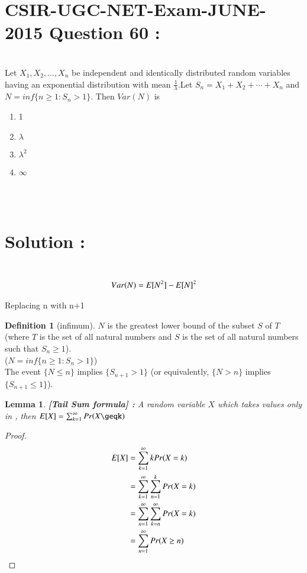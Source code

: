 \documentclass[journal,12pt,twocolumn]{IEEEtran}
\newtheorem{lemma}[theorem]{Lemma}
\theoremstyle{definition}
\newtheorem{definition}{Definition}[section]
\begin{document}
\section{CSIR-UGC-NET-Exam-JUNE-2015 Question 60 :}\\
Let $X_1, X_2, \dots, X_n$ be independent and identically distributed random variables having an exponential distribution with mean $\frac{1}{\lambda}$.Let $S_n = X_1 + X_2 + \cdots + X_n$ and $N = inf \{n \geq 1: S_n > 1\}$. Then $Var(N)$ is\\
\begin{enumerate}
    \item 1
    \item $\lambda$
    \item $\lambda^2$
    \item $\infty$
\end{enumerate}
\\ \\
\section{Solution :}\\
\begin{align}
    Var(N) = E[ N^2 ] - E[ N ]^2
\end{align}

Replacing n with n+1\\
\begin{definition}[infimum]
$N$ is the greatest lower bound of the subset $S$ of $T$ (where $T$ is the set of all natural numbers and $S$ is the set of all natural numbers such that $S_n \geq 1$).\\
($N = inf \{n \geq 1: S_n > 1\}$)\\
The event $\{N \leq n\}$ implies $\{S_{n+1} > 1\}$ (or equivalently, $\{N > n\}$ implies $\{S_{n+1} \leq 1\}$).\\
\end{definition}

\begin{lemma}\label{lemma1}
\textbf{[Tail Sum formula] : } A random variable $X$ which takes values only in , then $\mean{X} = \sum _{k=1} ^\infty Pr(X\geqk)$\\
\end{lemma}
\begin{proof}
\begin{align}
    E[ X ] &= \sum _{k = 1} ^\infty k Pr(X=k)\\
    &= \sum _{k = 1} ^\infty \sum _{n=1} ^k Pr(X=k)\\
    &= \sum _{n = 1} ^\infty \sum _{k = n} ^\infty Pr(X=k)\\
    &= \sum _{n = 1} ^\infty Pr(X\geq n)
\end{align}
\end{proof}
\end{document}
